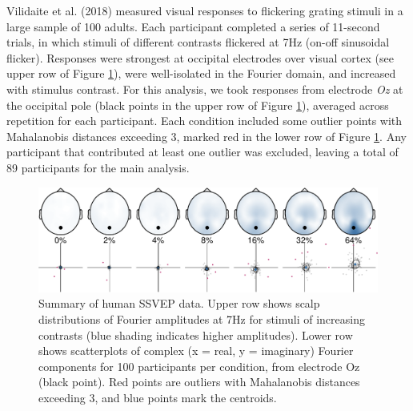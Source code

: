 \documentclass[]{article}
\begin{document}
Vilidaite et al. (2018) measured visual responses to flickering grating stimuli in a large sample of 100 adults. Each participant completed a series of 11-second trials, in which stimuli of different contrasts flickered at 7Hz (on-off sinusoidal flicker). Responses were strongest at occipital electrodes over visual cortex (see upper row of Figure \ref{fig:humanSSVEP}), were well-isolated in the Fourier domain, and increased with stimulus contrast. For this analysis, we took responses from electrode \emph{Oz} at the occipital pole (black points in the upper row of Figure \ref{fig:humanSSVEP}), averaged across repetition for each participant. Each condition included some outlier points with Mahalanobis distances exceeding 3, marked red in the lower row of Figure \ref{fig:humanSSVEP}. Any participant that contributed at least one outlier was excluded, leaving a total of 89 participants for the main analysis.

\begin{figure}

{\centering \includegraphics{manuscript_files/figure-latex/humanSSVEP-1} 

}

\caption{Summary of human SSVEP data. Upper row shows scalp distributions of Fourier amplitudes at 7Hz for stimuli of increasing contrasts (blue shading indicates higher amplitudes). Lower row shows scatterplots of complex (x = real, y = imaginary) Fourier components for 100 participants per condition, from electrode Oz (black point). Red points are outliers with Mahalanobis distances exceeding 3, and blue points mark the centroids.}\label{fig:humanSSVEP}
\end{figure}
\end{document}
